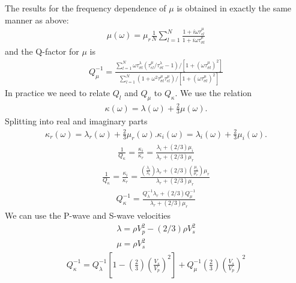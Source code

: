 \documentclass[11pt]{article}
\begin{document}
{The results for the frequency dependence of $\mu$ is obtained in exactly the same manner as above:
\begin{eqnarray}
\mu(\omega) = \mu_r \frac{1}{N}\sum_{l=1}^N\frac{1+i\omega\tau^{\mu}_{\epsilon l}}{1+i\omega\tau^{\mu}_{\sigma l}} 
\end{eqnarray}
 and the Q-factor for $\mu$ is
%
\begin{eqnarray}
Q^{-1}_{\mu} = \frac{\sum_{l=1}^N {\omega\tau^{\lambda}_{\sigma l}\left(\tau^{\mu}_{\epsilon l}/\tau^{\lambda}_{\sigma l} -1\right)}
                                           /\left[1 + (\omega\tau^{\mu}_{\sigma l})^2\right] 
                        }
                        {\sum_{l=1}^N (1 + \omega^2\tau^{\mu}_{\sigma l}\tau^{\mu}_{\epsilon l})
                                           /\left[1 + (\omega\tau^{\mu}_{\sigma l})^2\right]       
                        }
\end{eqnarray}
%
In practice we need to relate $Q_l$ and $Q_{\mu}$ to $Q_{\kappa}$. We use the relation
%
\begin{eqnarray}
\kappa(\omega) = \lambda(\omega)+ \frac{2}{3}\mu(\omega).
\end{eqnarray}
%
Splitting into real and imaginary parts
%
\begin{eqnarray}
\kappa_r(\omega) = \lambda_r(\omega)+ \frac{2}{3}\mu_r(\omega).
\kappa_i(\omega) = \lambda_i(\omega)+ \frac{2}{3}\mu_i(\omega).
\end{eqnarray}
%
\begin{eqnarray}
\frac{1}{Q_{\kappa}} = \frac{\kappa_i}{\kappa_r} = \frac{\lambda_i + (2/3)\mu_i}{\lambda_r + (2/3)\mu_r}
\end{eqnarray}
%
%
\begin{eqnarray}
\frac{1}{Q_{\kappa}} = \frac{\kappa_i}{\kappa_r} = \frac{\left(\frac{\lambda_i}{\lambda_r}\right)\lambda_r
                                                   + (2/3)\left(\frac{\mu_i}{\mu_r}\right)\mu_r}
                                                  {\lambda_r + (2/3)\mu_r}
\end{eqnarray}
%
%
\begin{eqnarray}
Q^{-1}_{\kappa} = \frac{Q^{-1}_\lambda \lambda_r + (2/3)Q^{-1}_{\mu}}
                                                  {\lambda_r + (2/3)\mu_r}
\end{eqnarray}
%
We can use the P-wave and S-wave velocities
%
\begin{eqnarray}
\lambda = \rho V^2_p - (2/3)\rho V^2_s \nonumber\\
\mu = \rho V^2_s
\end{eqnarray}
%
\begin{eqnarray}
Q^{-1}_{\kappa} = Q^{-1}_\lambda\left[1-\left(\frac{2}{3}\right)\left(\frac{V_s}{V_p}\right)^2\right]
                  + Q^{-1}_{\mu}\left(\frac{2}{3}\right)\left(\frac{V_s}{V_p}\right)^2
\end{eqnarray}
%
}
\end{document}
